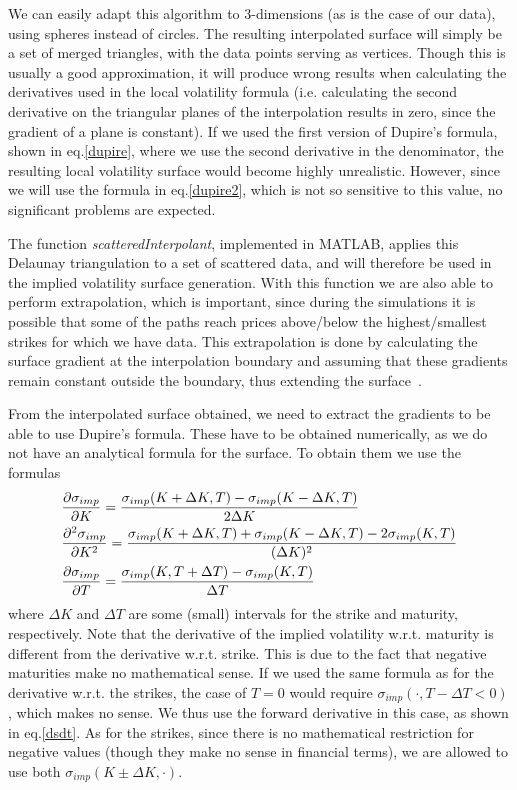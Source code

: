 We can easily adapt this algorithm to 3-dimensions (as is the case of our data), using spheres instead of circles.
The resulting interpolated surface will simply be a set of merged triangles, with the data points serving as vertices. Though this is usually a good approximation, it will produce wrong results when calculating the derivatives used in the local volatility formula (i.e. calculating the second derivative on the triangular planes of the interpolation results in zero, since the gradient of a plane is constant). If we used the first version of Dupire's formula, shown in eq.\eqref{dupire}, where we use the second derivative in the denominator, the resulting local volatility surface would become highly unrealistic. However, since we will use the formula in eq.\eqref{dupire2}, which is not so sensitive to this value, no significant problems are expected.

The function \emph{scatteredInterpolant}, implemented in MATLAB, applies this Delaunay triangulation to a set of scattered data, and will therefore be used in the implied volatility surface generation. With this function we are also able to perform extrapolation, which is important, since during the simulations it is possible that some of the paths reach prices above/below the highest/smallest strikes for which we have data. This extrapolation is done by calculating the surface gradient at the interpolation boundary and assuming that these gradients remain constant outside the boundary, thus extending the surface~\citep{MATLABextrap}.


From the interpolated surface obtained, we need to extract the gradients to be able to use Dupire's formula. These have to be obtained numerically, as we do not have an analytical formula for the surface. To obtain them we use the formulas
\begin{subequations}
\begin{align}
&\pdv{\sigma_{imp}}{K}(K,T)=\frac{\sigma_{imp}(K+\Delta K,T)-\sigma_{imp}(K-\Delta K,T)}{2\Delta K}\\
&\pdv{^2\sigma_{imp}}{K^2}(K,T)=\frac{\sigma_{imp}(K+\Delta K,T)+\sigma_{imp}(K-\Delta K,T)-2\sigma_{imp}(K,T)}{(\Delta K)^2}\\
&\pdv{\sigma_{imp}}{T}(K,T)=\frac{\sigma_{imp}(K,T+\Delta T)-\sigma_{imp}(K,T)}{\Delta T}\label{dsdt}
\end{align}
\end{subequations}
\noindent where $\Delta K$ and $\Delta T$ are some (small) intervals for the strike and maturity, respectively. Note that the derivative of the implied volatility w.r.t. maturity is different from the derivative w.r.t. strike. This is due to the fact that negative maturities make no mathematical sense. If we used the same formula as for the derivative w.r.t. the strikes, the case of $T=0$ would require $\sigma_{imp}(\cdot,T-\Delta T<0)$, which makes no sense. We thus use the forward derivative in this case, as shown in eq.\eqref{dsdt}. As for the strikes, since there is no mathematical restriction for negative values (though they make no sense in financial terms), we are allowed to use both $\sigma_{imp}(K\pm\Delta K,\cdot)$.

